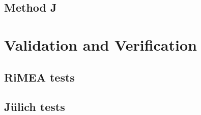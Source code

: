 \documentclass[%
paper=A4,					%
twoside=true,				%
openright,					%
parskip=full,				%
chapterprefix=true,			%
11pt,						%
headings=normal,			%
bibliography=totoc,			%
listof=totoc,				%
titlepage=on,				%
captions=tableabove,		%
draft=false,				%
]{scrreprt}%
\begin{document}
\subsection{Method J}


\newpage
\section{Validation and Verification}
\subsection{RiMEA tests}

\newpage
\subsection{J\"ulich tests}



% 
% 

\end{document}
